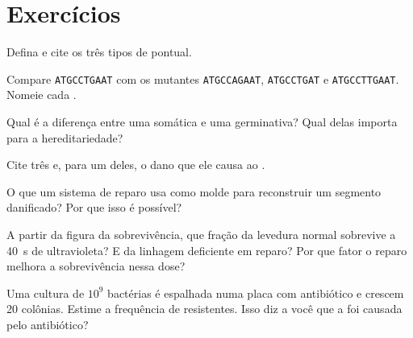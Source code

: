 \section{Exercícios}

\begin{exercise}[$\star$]\label{exo:g11:mutations:1}
Defina  e cite os três tipos de  pontual.
\end{exercise}

\begin{exercise}[$\star$]\label{exo:g11:mutations:2}
Compare \texttt{ATGCCTGAAT} com os mutantes \texttt{ATGCCAGAAT},
\texttt{ATGCCTGAT} e \texttt{ATGCCTTGAAT}. Nomeie cada .
\end{exercise}

\begin{exercise}[$\star$]\label{exo:g11:mutations:3}
Qual é a diferença entre uma  somática e uma germinativa? Qual
delas importa para a hereditariedade?
\end{exercise}

\begin{exercise}[$\star$]\label{exo:g11:mutations:4}
Cite três  e, para um deles, o dano que ele causa ao .
\end{exercise}

\begin{exercise}[$\star$]\label{exo:g11:mutations:5}
O que um sistema de reparo usa como molde para reconstruir um segmento
danificado? Por que isso é possível?
\end{exercise}

\begin{exercise}[$\star\star$]\label{exo:g11:mutations:6}
A partir da figura da sobrevivência, que fração da levedura normal
sobrevive a \qty{40}{s} de ultravioleta? E da linhagem deficiente em
reparo? Por que fator o reparo melhora a sobrevivência nessa dose?
\end{exercise}

\begin{exercise}[$\star\star$]\label{exo:g11:mutations:7}
Uma cultura de $10^9$ bactérias é espalhada numa placa com antibiótico
e crescem 20 colônias. Estime a frequência de  resistentes. Isso
diz a você que a  foi causada pelo antibiótico?
\end{exercise}


